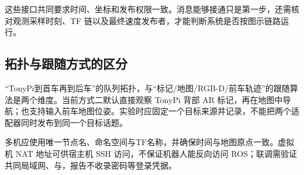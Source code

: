 这些接口共同要求时间、坐标和发布权限一致。消息能够接通只是第一步，还需核对观测采样时刻、TF 链以及最终速度发布者，才能判断系统是否按图示链路运行。


\subsection{拓扑与跟随方式的区分}
“TonyPi到首车再到后车”的队列拓扑，与“标记/地图/RGB-D/前车轨迹”的跟随算法是两个维度。当前方式二默认直接观察 TonyPi 背部 AR 标记，再在地图中导航；也支持输入前车地图位姿。实验时应固定一个目标来源并记录，不能把两个适配器同时发布到同一个目标话题。

多机应使用唯一节点名、命名空间与TF名称，并确保时间与地图原点一致。虚拟机 NAT 地址可供宿主机 SSH 访问，不保证机器人能反向访问 ROS；联调需验证共同局域网、与，报告不收录密码等登录凭据。
